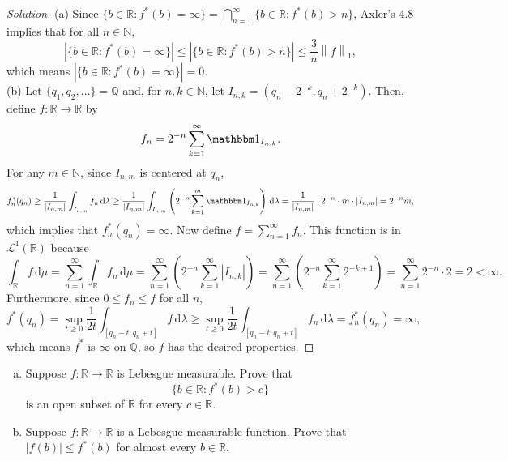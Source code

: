 \documentclass[10pt]{article}
\newcommand{\dd}{\,\mathrm{d}}
\providecommand{\NN}{\mathbb N}
\providecommand{\QQ}{\mathbb Q}
\providecommand{\RR}{\mathbb R}
\providecommand{\ind}{\mathbbm 1}
\providecommand{\ii}{\item}
\newenvironment{soln}{\begin{proof}[Solution]}{\end{proof}}
\providecommand{\abs}[1]{\left\lvert #1\right\rvert}
\providecommand{\norm}[1]{\left\| #1\right\|}
\begin{document}
\begin{soln}
    (a) Since $\{b\in\RR : f^*(b) = \infty\} =
    \bigcap_{n=1}^\infty \{b\in\RR : f^*(b) > n\}$,
    Axler's 4.8 implies that for all $n\in\NN$,
    \begin{equation*}
	\abs{\{b\in\RR : f^*(b) = \infty\}} \le
	\abs{\{b\in\RR : f^*(b) > n\}} \le \frac 3n\norm f_1,
    \end{equation*}
    which means $\abs{\{b\in\RR : f^*(b) = \infty\}} = 0$.
    \\

    (b) Let $\{q_1,q_2,\dots\} = \QQ$ and,
    for $n,k\in\NN$, let $I_{n,k} = (q_n - 2^{-k}, q_n + 2^{-k})$.
    Then, define $f\colon\RR\to\RR$ by
    \begin{equation*}
	f_n = 2^{-n}\sum_{k=1}^\infty \ind_{I_{n,k}}.
    \end{equation*}
    For any $m\in\NN$, since $I_{n,m}$ is centered at $q_n$,
    \begin{equation*}
	f^*_n(q_n) \ge \frac 1{\abs{I_{n,m}}}\int_{I_{n,m}}f_n\dd\lambda
	\ge \frac 1{\abs{I_{n,m}}}
	\int_{I_{n,m}}\left(2^{-n}\sum_{k=1}^m \ind_{I_{n,k}}\right)\dd\lambda
	= \frac{1}{\abs{I_{n,m}}}\cdot 2^{-n}\cdot m\cdot\abs{I_{n,m}} = 2^{-n}m,
    \end{equation*}
    which implies that $f^*_n(q_n) = \infty$.
    Now define $f = \sum_{n=1}^\infty f_n$.
    This function is in $\mathcal L^1(\RR)$ because
    \begin{equation*}
	\int_\RR f\dd\mu = \sum_{n=1}^\infty \int_\RR f_n\dd\mu
	= \sum_{n=1}^\infty \left(2^{-n}\sum_{k=1}^\infty \abs{I_{n,k}}\right)
	= \sum_{n=1}^\infty \left(2^{-n}\sum_{k=1}^\infty 2^{-k+1}\right)
	= \sum_{n=1}^\infty 2^{-n}\cdot 2 = 2 < \infty.
    \end{equation*}
    Furthermore, since $0\le f_n \le f$ for all $n$,
    \begin{equation*}
	f^*(q_n) = \sup_{t\ge0} \frac 1{2t}\int_{[q_n-t,q_n+t]} f\dd\lambda
	\ge \sup_{t\ge0} \frac 1{2t}\int_{[q_n-t,q_n+t]} f_n\dd\lambda
	= f^*_n(q_n) = \infty,
    \end{equation*}
    which means $f^*$ is $\infty$ on $\QQ$,
    so $f$ has the desired properties.
\end{soln}

\begin{problem}
    [Axler 4A \#9, 4B\#5]
    \begin{enumerate}[(a)]
        \ii Suppose $f\colon\RR\to\RR$ is Lebesgue measurable. Prove that
	\begin{equation*}
	    \{b\in\RR : f^*(b) > c\}
	\end{equation*}
	is an open subset of $\RR$ for every $c\in\RR$.
	\ii Suppose $f\colon\RR\to\RR$ is a Lebesgue measurable function.
	Prove that $\abs{f(b)} \le f^*(b)$
	for almost every $b\in\RR$.
    \end{enumerate}
\end{problem}
\end{document}
